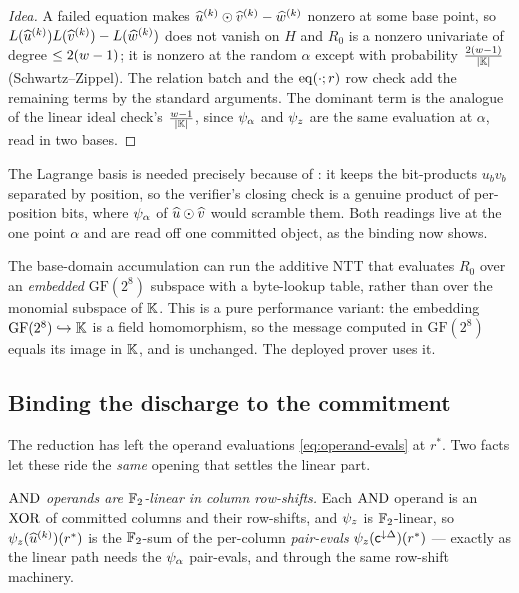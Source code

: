 \begin{proof}[Idea]
A failed equation makes
$\widehat{u}^{(k)}\odot\widehat{v}^{(k)}-\widehat{w}^{(k)}$ nonzero at some base point, so
$L(\widehat{u}^{(k)})L(\widehat{v}^{(k)})-L(\widehat{w}^{(k)})$ does not vanish on $H$ and $R_0$
is a nonzero univariate of degree $\le 2(w-1)$; it is nonzero at the random
$\alpha$ except with probability $\frac{2(w-1)}{|\mathbb{K}|}$ (Schwartz--Zippel).
The relation batch and the $\operatorname{eq}(\cdot;r)$ row check add the remaining terms by
the standard arguments. The dominant term is the analogue of the linear ideal
check's $\frac{w-1}{|\mathbb{K}|}$, since $\psi_{\alpha}$ and $\psi_{z}$ are the same evaluation
at $\alpha$, read in two bases.
\end{proof}

The Lagrange basis is needed precisely because of : it
keeps the bit-products $u_b v_b$ separated by position, so the verifier's closing
check is a genuine product of per-position bits, where $\psi_{\alpha}$ of
$\widehat{u}\odot\widehat{v}$ would scramble them. Both readings live at the one point
$\alpha$ and are read off one committed object, as the binding now shows.

\begin{remark}
\label{rem:gf8}
The base-domain accumulation can run the additive NTT that evaluates $R_0$ over
an \emph{embedded} $\mathrm{GF}(2^8)$ subspace with a byte-lookup table, rather
than over the monomial subspace of $\mathbb{K}$. This is a pure performance variant: the
embedding $\mathrm{GF}(2^8)\hookrightarrow\mathbb{K}$ is a field homomorphism, so the
message computed in $\mathrm{GF}(2^8)$ equals its image in $\mathbb{K}$, and
 is unchanged. The deployed prover uses it.
\end{remark}

\subsection{Binding the discharge to the commitment}
\label{sec:had-binding}

The reduction has left the operand evaluations \eqref{eq:operand-evals} at $r^*$.
Two facts let these ride the \emph{same} opening that settles the linear part.

\emph{$\operatorname{AND}$ operands are $\mathbb{F}_2$-linear in column row-shifts.} Each $\operatorname{AND}$
operand is an $\operatorname{XOR}$ of committed columns and their row-shifts, and $\psi_{z}$ is
$\mathbb{F}_2$-linear, so $\psi_{z}(\widehat{u}^{(k)})(r^*)$ is the $\mathbb{F}_2$-sum of the
per-column \emph{pair-evals} $\psi_{z}(\mathsf{c}^{\downarrow\Delta})(r^*)$ --- exactly
as the linear path needs the $\psi_{\alpha}$ pair-evals, and through the same row-shift
machinery.

